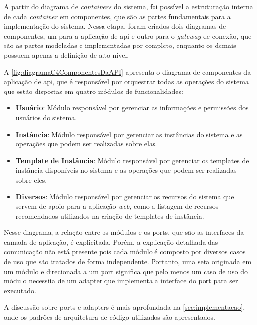 A partir do diagrama de \textit{containers} do sistema, foi possível a estruturação interna de cada \textit{container} em componentes, que são as partes fundamentais para a implementação do sistema.
Nessa etapa, foram criados dois diagramas de componentes, um para a aplicação de \gls{api} e outro para o \textit{gateway} de conexão, que são as partes modeladas e implementadas por completo, enquanto os demais possuem apenas a definição de alto nível.

A \autoref{fig:diagramaC4ComponentesDaAPI} apresenta o diagrama de componentes da aplicação de \gls{api}, que é responsável por orquestrar todas as operações do sistema que estão dispostas em quatro módulos de funcionalidades:

\begin{itemize}
    \item \textbf{Usuário}: Módulo responsável por gerenciar as informações e permissões dos usuários do sistema.

    \item \textbf{Instância}: Módulo responsável por gerenciar as instâncias do sistema e as operações que podem ser realizadas sobre elas.

    \item \textbf{Template de Instância}: Módulo responsável por gerenciar os templates de instância disponíveis no sistema e as operações que podem ser realizadas sobre eles.

    \item \textbf{Diversos}: Módulo responsável por gerenciar os recursos do sistema que servem de apoio para a aplicação \textit{web}, como a listagem de recursos recomendados utilizados na criação de templates de instância.

\end{itemize}

Nesse diagrama, a relação entre os módulos e os \glspl{port}, que são as interfaces da camada de aplicação, é explicitada. Porém, a explicação detalhada das comunicação não está presente pois cada módulo é composto por diversos casos de uso que são tratados de forma independente. Portanto, uma seta originada em um módulo e direcionada a um \gls{port} significa que pelo menos um caso de uso do módulo necessita de um \gls{adapter} que implementa a interface do \gls{port} para ser executado. 

A discussão sobre \glspl{port} e \glspl{adapter} é mais aprofundada na \autoref{sec:implementacao},
onde os padrões de arquitetura de código utilizados são apresentados.

